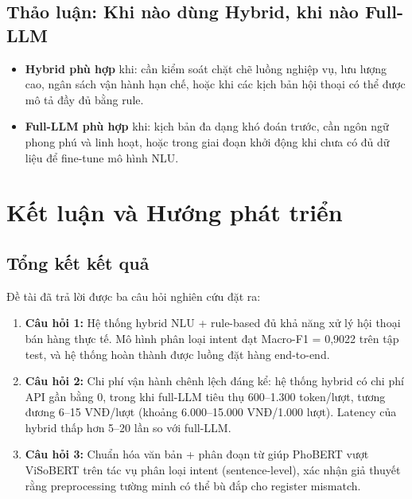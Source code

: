 \documentclass[12pt, a4paper]{report}
\begin{document}
\section{Thảo luận: Khi nào dùng Hybrid, khi nào Full-LLM}

\begin{itemize}
  \item \textbf{Hybrid phù hợp} khi: cần kiểm soát chặt chẽ luồng nghiệp vụ,
        lưu lượng cao, ngân sách vận hành hạn chế, hoặc khi các kịch bản
        hội thoại có thể được mô tả đầy đủ bằng rule.
  \item \textbf{Full-LLM phù hợp} khi: kịch bản đa dạng khó đoán trước,
        cần ngôn ngữ phong phú và linh hoạt, hoặc trong giai đoạn
        khởi động khi chưa có đủ dữ liệu để fine-tune mô hình NLU.
\end{itemize}

\chapter*{Kết luận và Hướng phát triển}

\section*{Tổng kết kết quả}

Đề tài đã trả lời được ba câu hỏi nghiên cứu đặt ra:

\begin{enumerate}
  \item \textbf{Câu hỏi 1:} Hệ thống hybrid NLU + rule-based
        đủ khả năng xử lý hội thoại bán hàng thực tế.
        Mô hình phân loại intent đạt Macro-F1 = 0,9022 trên tập test,
        và hệ thống hoàn thành được luồng đặt hàng end-to-end.
  \item \textbf{Câu hỏi 2:} Chi phí vận hành chênh lệch đáng kể:
        hệ thống hybrid có chi phí API gần bằng 0, trong khi full-LLM
        tiêu thụ 600--1.300 token/lượt, tương đương 6--15 VNĐ/lượt
        (khoảng 6.000--15.000 VNĐ/1.000 lượt). Latency của hybrid
        thấp hơn 5--20 lần so với full-LLM.
  \item \textbf{Câu hỏi 3:} Chuẩn hóa văn bản + phân đoạn từ giúp
        PhoBERT vượt ViSoBERT trên tác vụ phân loại intent (sentence-level),
        xác nhận giả thuyết rằng preprocessing tường minh có thể bù đắp
        cho register mismatch.
\end{enumerate}
\end{document}
